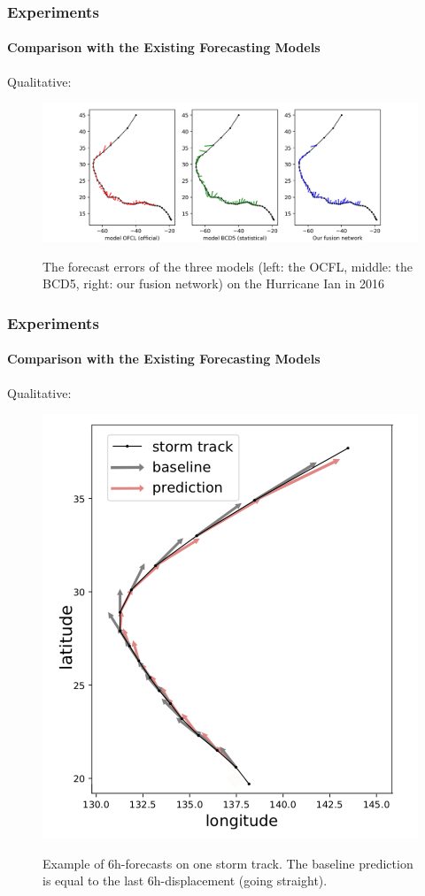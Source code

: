 \documentclass{beamer}
\begin{document}
\begin{frame}
\frametitle{Experiments}
\framesubtitle{Comparison with the Existing Forecasting Models}
Qualitative: 

\begin{figure}
	\includegraphics[width=1.0\linewidth]{figs/one_stom_result.png}\\
	\caption{The forecast errors of the three models (left: the OCFL, middle: the BCD5, right: our fusion network) on the Hurricane Ian in 2016}
\end{figure}
\end{frame}

\begin{frame}
\frametitle{Experiments}
\framesubtitle{Comparison with the Existing Forecasting Models}
Qualitative: 

\begin{figure}
	\includegraphics[height=0.6\textheight, width=0.4\linewidth]{figs/6h_track.png}\\
	\caption{\small{Example of 6h-forecasts on one storm track. The baseline prediction is equal to the last 6h-displacement (going straight).}}
\end{figure}
\end{frame}
\end{document}
